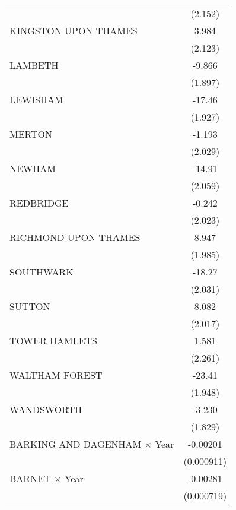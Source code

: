{\begin{longtable}{l*{1}{c}}
                    &     (2.152)         \\
\addlinespace
KINGSTON UPON THAMES&       3.984         \\
                    &     (2.123)         \\
\addlinespace
LAMBETH             &      -9.866\sym{***}\\
                    &     (1.897)         \\
\addlinespace
LEWISHAM            &      -17.46\sym{***}\\
                    &     (1.927)         \\
\addlinespace
MERTON              &      -1.193         \\
                    &     (2.029)         \\
\addlinespace
NEWHAM              &      -14.91\sym{***}\\
                    &     (2.059)         \\
\addlinespace
REDBRIDGE           &      -0.242         \\
                    &     (2.023)         \\
\addlinespace
RICHMOND UPON THAMES&       8.947\sym{***}\\
                    &     (1.985)         \\
\addlinespace
SOUTHWARK           &      -18.27\sym{***}\\
                    &     (2.031)         \\
\addlinespace
SUTTON              &       8.082\sym{***}\\
                    &     (2.017)         \\
\addlinespace
TOWER HAMLETS       &       1.581         \\
                    &     (2.261)         \\
\addlinespace
WALTHAM FOREST      &      -23.41\sym{***}\\
                    &     (1.948)         \\
\addlinespace
WANDSWORTH          &      -3.230         \\
                    &     (1.829)         \\
\addlinespace
BARKING AND DAGENHAM $\times$ Year&    -0.00201\sym{*}  \\
                    &  (0.000911)         \\
\addlinespace
BARNET $\times$ Year&    -0.00281\sym{***}\\
                    &  (0.000719)         \\

\end{longtable}}
